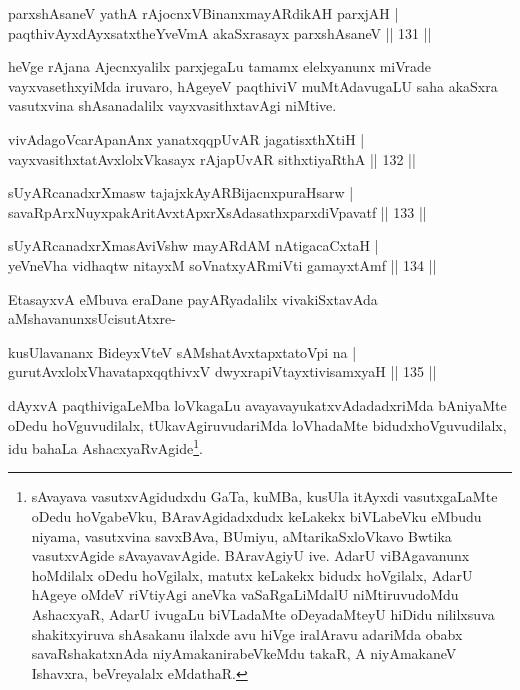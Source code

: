\begin{shl}
parxshAsaneV yathA rAjocnxV\s BinanxmayARdikAH parxjAH |\\
paqthivAyxdAyxsatxtheYveVmA akaSxrasayx parxshAsaneV \hfill || 131 ||
\end{shl}

\begin{artha}
heVge rAjana Ajecnxyalilx parxjegaLu tamamx elelxyanunx miVrade vayxvasethxyiMda iruvaro, hAgeyeV paqthiviV muMtAdavugaLU saha akaSxra vasutxvina shAsanadalilx vayxvasithxtavAgi niMtive.
\end{artha}


\begin{shl}
vivAdagoVcarApanAnx yanatxqqpUvAR jagatisxthXtiH |\\
vayxvasithxtatAvxlolxVkasayx rAjapUvAR sithxtiyaRthA \hfill || 132 ||
\end{shl}

\begin{shl}
sUyARcanadxrXmasw tajajxkAyARBijacnxpuraHsarw |\\
savaRpArxNuyxpakAritAvxtApxrXsAdasathxparxdiVpavatf \hfill || 133 ||
\end{shl}

\begin{shl}
sUyARcanadxrXmasAviVshw mayARdAM nAtigacaCxtaH |\\
yeVneVha vidhaqtw nitayxM soV\s natxyARmiVti gamayxtAmf \hfill || 134 ||
\end{shl}

\begin{artha}
EtasayxvA eMbuva eraDane payARyadalilx vivakiSxtavAda aMshavanunx\break sUcisutAtxre-
\end{artha}

\begin{shl}
kusUlavananx BideyxVteV sAMshatAvxtapxtatoV\s pi na |\\
gurutAvxlolxVhavatapxqqthivxV dwyxrapiVtayxtivisamxyaH \hfill || 135 ||
\end{shl}

\begin{artha}%
dAyxvA paqthivigaLeMba loVkagaLu avayavayukatxvAdadadxriMda bAniyaMte oDedu hoVguvudilalx, tUkavAgiruvudariMda loVhadaMte bidudxhoVguvudilalx, idu bahaLa AshacxyaRvAgide\footnote{sAvayava vasutxvAgidudxdu GaTa, kuMBa, kusUla itAyxdi vasutxgaLaMte oDedu hoVgabeVku, BAravAgidadxdudx keLakekx biVLabeVku eMbudu niyama, vasutxvina savxBAva, BUmiyu, aMtarikaSxloVkavo Bwtika vasutxvAgide sAvayavavAgide. BAravAgiyU ive. AdarU viBAgavanunx hoMdilalx oDedu hoVgilalx, matutx keLakekx bidudx hoVgilalx, AdarU hAgeye oMdeV riVtiyAgi aneVka vaSaRgaLiMdalU niMtiruvudoMdu AshacxyaR, AdarU ivugaLu biVLadaMte oDeyadaMteyU hiDidu nililxsuva shakitxyiruva shAsakanu ilalxde avu hiVge iralAravu adariMda obabx savaRshakatxnAda niyAmakanirabeVkeMdu takaR, A niyAmakaneV Ishavxra, beVreyalalx eMdathaR.}.
\end{artha}

